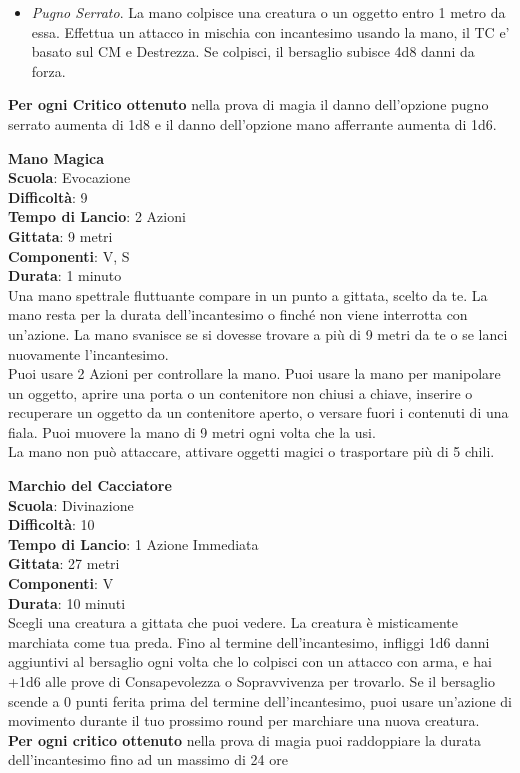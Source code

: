 \begin{multicols}{2}
\begin{itemize}
\item
\textit{Pugno Serrato}. La mano colpisce una creatura o un oggetto entro 1 metro da essa. Effettua un attacco in mischia con incantesimo usando la mano, il TC e' basato sul CM e Destrezza. Se colpisci, il bersaglio subisce 4d8 danni da forza.
\end{itemize}
\medskip
\textbf{Per ogni Critico ottenuto} nella prova di magia il danno dell'opzione pugno serrato aumenta di 1d8 e il danno dell'opzione mano afferrante aumenta di 1d6.

\medskip\textbf{Mano Magica}\\
\textbf{Scuola}: Evocazione\\
\textbf{Difficoltà}:  9\\
\textbf{Tempo di Lancio}: 2 Azioni\\
\textbf{Gittata}: 9 metri\\
\textbf{Componenti}: V, S\\
\textbf{Durata}: 1 minuto\\
Una mano spettrale fluttuante compare in un punto a gittata, scelto da te. La mano resta per la durata dell'incantesimo o finché non viene interrotta con un'azione. La mano svanisce se si dovesse trovare a più di 9 metri da te o se lanci nuovamente l'incantesimo.\\
Puoi usare 2 Azioni per controllare la mano. Puoi usare la mano per manipolare un oggetto, aprire una porta o un contenitore non chiusi a chiave, inserire o recuperare un oggetto da un contenitore aperto, o versare fuori i contenuti di una fiala. Puoi muovere la mano di 9 metri ogni volta che la usi.\\
La mano non può attaccare, attivare oggetti magici o trasportare più di 5 chili.

\medskip\textbf{Marchio del Cacciatore}\\
\textbf{Scuola}: Divinazione\\
\textbf{Difficoltà}:  10\\
\textbf{Tempo di Lancio}: 1 Azione Immediata\\
\textbf{Gittata}: 27 metri\\
\textbf{Componenti}: V\\
\textbf{Durata}: 10 minuti\\
Scegli una creatura a gittata che puoi vedere. La creatura è misticamente marchiata come tua preda. Fino al termine dell'incantesimo, infliggi 1d6 danni aggiuntivi al bersaglio ogni volta che lo colpisci con un attacco con arma, e hai +1d6 alle prove di Consapevolezza o Sopravvivenza per trovarlo. Se il bersaglio scende a 0 punti ferita prima del termine dell'incantesimo, puoi usare un'azione di movimento durante il tuo prossimo round per marchiare una nuova creatura.\\
\textbf{Per ogni critico ottenuto} nella prova di magia puoi raddoppiare la durata dell'incantesimo fino ad un massimo di 24 ore


\end{multicols}

